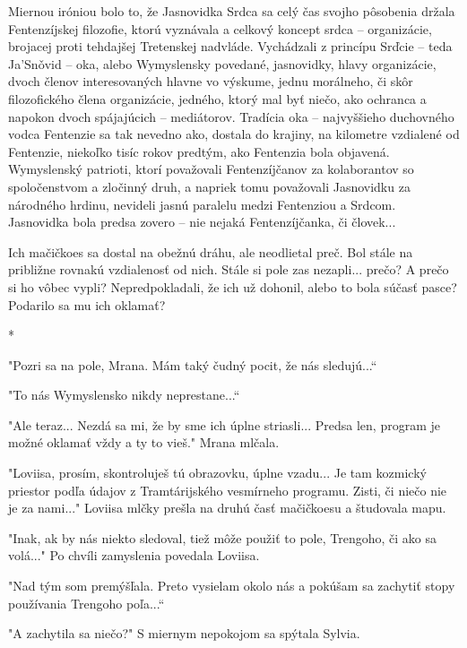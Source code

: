 \documentclass{book}
\begin{document}
Miernou iróniou bolo to, že Jasnovidka Srdca sa celý čas svojho pôsobenia držala Fentenzíjskej filozofie, ktorú vyznávala a celkový koncept srdca – organizácie, brojacej proti tehdajšej Tretenskej nadvláde. Vychádzali z princípu Srd\v{}cie – teda Ja'Sno\v{}vid – oka, alebo Wymyslensky povedané, jasnovidky, hlavy organizácie, dvoch členov interesovaných hlavne vo výskume, jednu morálneho, či skôr filozofického člena organizácie, jedného, ktorý mal byť niečo, ako ochranca a napokon dvoch spájajúcich – mediátorov. Tradícia oka – najvyššieho duchovného vodca Fentenzie sa tak nevedno ako, dostala do krajiny, na kilometre vzdialené od Fentenzie, niekoľko tisíc rokov predtým, ako Fentenzia bola objavená. Wymyslenský patrioti, ktorí považovali Fentenzíjčanov za kolaborantov so spoločenstvom a zločinný druh, a napriek tomu považovali Jasnovidku za národného hrdinu, nevideli jasnú paralelu medzi Fentenziou a Srdcom. Jasnovidka bola predsa zovero – nie nejaká Fentenzíjčanka, či človek...

Ich mačičkoes sa dostal na obežnú dráhu, ale neodlietal preč. Bol stále na približne rovnakú vzdialenosť od nich. Stále si pole zas nezapli... prečo? A prečo si ho vôbec vypli? Nepredpokladali, že ich už dohonil, alebo to bola súčasť pasce? Podarilo sa mu ich oklamať?

\begin{center}

*

\end{center}

"$ $Pozri sa na pole, Mrana. Mám taký čudný pocit, že nás sledujú...“

"$ $To nás Wymyslensko nikdy neprestane...“

"$ $Ale teraz... Nezdá sa mi, že by sme ich úplne striasli... Predsa len, program je možné oklamať vždy a ty to vieš."$ $ Mrana mlčala.

"$ $Loviisa, prosím, skontroluješ tú obrazovku, úplne vzadu... Je tam kozmický priestor podľa údajov z Tramtárijského vesmírneho programu. Zisti, či niečo nie je za nami..."$ $ Loviisa mlčky prešla na druhú časť mačičkoesu a študovala mapu.

"$ $Inak, ak by nás niekto sledoval, tiež môže použiť to pole, Trengoho, či ako sa volá..."$ $ Po chvíli zamyslenia povedala Loviisa.

"$ $Nad tým som premýšľala. Preto vysielam okolo nás a pokúšam sa zachytiť stopy používania Trengoho poľa...“

"$ $A zachytila sa niečo?"$ $ S miernym nepokojom sa spýtala Sylvia.
\end{document}
